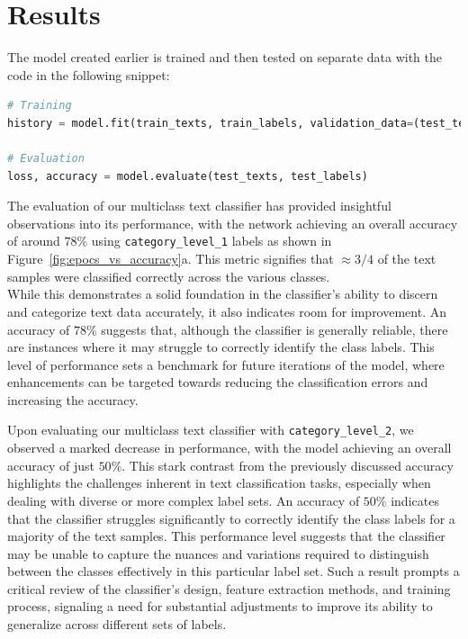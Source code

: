 \section{Results}
The model created earlier is trained and then tested on separate data with the code in the following snippet:
\begin{lstlisting}[language=Python]
# Training
history = model.fit(train_texts, train_labels, validation_data=(test_texts, test_labels), epochs=epochs, batch_size=batch_size, use_multiprocessing=True)

# Evaluation
loss, accuracy = model.evaluate(test_texts, test_labels)
\end{lstlisting}

The evaluation of our multiclass text classifier has provided insightful observations into its performance, with the network achieving an overall accuracy of around $78\%$ using \verb|category_level_1| labels as shown in Figure~\ref{fig:epocs_vs_accuracy}a.
This metric signifies that $\approx 3/4$ of the text samples were classified correctly across the various classes.\\
While this demonstrates a solid foundation in the classifier's ability to discern and categorize text data accurately, it also indicates room for improvement.
An accuracy of $78\%$ suggests that, although the classifier is generally reliable, there are instances where it may struggle to correctly identify the class labels.
This level of performance sets a benchmark for future iterations of the model, where enhancements can be targeted towards reducing the classification errors and increasing the accuracy.

Upon evaluating our multiclass text classifier with \verb|category_level_2|, we observed a marked decrease in performance, with the model achieving an overall accuracy of just $50\%$. This stark contrast from the previously discussed accuracy highlights the challenges inherent in text classification tasks, especially when dealing with diverse or more complex label sets. An accuracy of $50\%$ indicates that the classifier struggles significantly to correctly identify the class labels for a majority of the text samples. This performance level suggests that the classifier may be unable to capture the nuances and variations required to distinguish between the classes effectively in this particular label set. Such a result prompts a critical review of the classifier’s design, feature extraction methods, and training process, signaling a need for substantial adjustments to improve its ability to generalize across different sets of labels.

